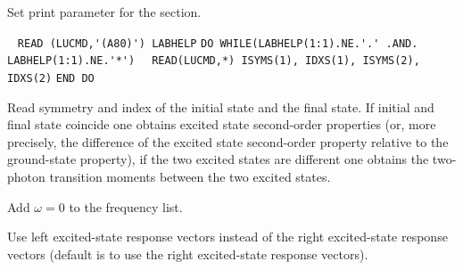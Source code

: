 \begin{description}
Set print parameter for the  section.
 
\item[\Key{SELSTA}] \verb| |\newline
\verb|READ (LUCMD,'(A80)') LABHELP|\newline
\verb|DO WHILE(LABHELP(1:1).NE.'.' .AND. LABHELP(1:1).NE.'*')|\newline
\verb|  READ(LUCMD,*) ISYMS(1), IDXS(1), ISYMS(2), IDXS(2)|\newline
\verb|END DO|

Read symmetry and index of the initial state and the final state.
If initial and final state coincide one obtains excited state
second-order properties (or, more precisely, the difference of the excited state second-order property relative to the ground-state property), if the two excited states are different one obtains the
two-photon transition moments between the two excited states.
 
\item[\Key{STATIC}] 
Add $\omega = 0$ to the frequency list.
 
\item[\Key{USELEF}] 
Use left excited-state response vectors instead of the right excited-state response vectors (default is to use the right excited-state
response vectors).
 
\end{description}
